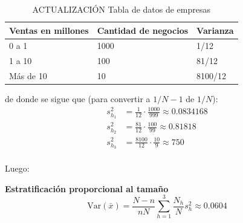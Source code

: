 \documentclass[
]{book}
\begin{document}
\begin{table}[!htb]
    \centering
    \begin{tabular}{lll}
         \bf Ventas en millones & \bf Cantidad de negocios & \bf Varianza\\
         \hline
         \hline
        0 a 1 & 1000 & 1/12\\
        1 a 10 & 100 & 81/12 \\
        Más de 10 & 10 & 8100/12\\
         \hline
         \hline
    \end{tabular}
    \caption{ACTUALIZACIÓN Tabla de datos de empresas}
\end{table}

de donde se sigue que (para convertir a \(1/N-1\) de \(1/N\)):
\begin{equation}\nonumber
\begin{aligned}
s^2_{h_1} & = \frac{1}{12} \cdot \frac{1000}{999} \approx 0.0834168 \\
s^2_{h_2} & = \frac{81}{12} \cdot \frac{100}{99} \approx 0.81818 \\
s^2_{h_3} & = \frac{8100}{12} \cdot \frac{10}{9} \approx 750 \\
\end{aligned}
\end{equation}

Luego:

\textbf{Estratificación proporcional al tamaño}
\[
\textrm{Var}(\bar{x}) = \dfrac{N - n}{nN} \sum\limits_{h = 1}^3 \dfrac{N_h}{N} s^2_{h} \approx 0.0604
\]
\end{document}
